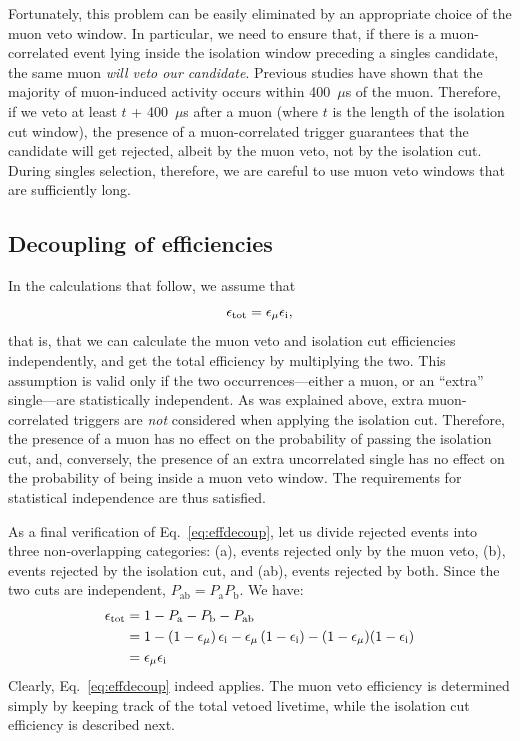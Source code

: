 \documentclass[../thesis.tex]{subfiles}
\begin{document}
Fortunately, this problem can be easily eliminated by an appropriate choice of the muon veto window. In particular, we need to ensure that, if there is a muon-correlated event lying inside the isolation window preceding a singles candidate, the same muon \emph{will veto our candidate}. Previous studies have shown that the majority of muon-induced activity occurs within 400~$\mu$s of the muon. Therefore, if we veto at least $t$ + 400~$\mu$s after a muon (where $t$ is the length of the isolation cut window), the presence of a muon-correlated trigger guarantees that the candidate will get rejected, albeit by the muon veto, not by the isolation cut. During singles selection, therefore, we are careful to use muon veto windows that are sufficiently long.

\subsection{Decoupling of efficiencies}
\label{sec:effdecoup}

\def\Pa{\ensuremath{P_\mathrm{a}}}
\def\Pb{\ensuremath{P_\mathrm{b}}}
\def\Pab{\ensuremath{P_\mathrm{ab}}}

In the calculations that follow, we assume that
\begin{equation}
  \label{eq:effdecoup}
  \epsilon_\mathrm{tot} = \epsilon_\mathrm{\mu} \epsilon_\mathrm{i},
\end{equation}
that is, that we can calculate the muon veto and isolation cut efficiencies independently, and get the total efficiency by multiplying the two. This assumption is valid only if the two occurrences---either a muon, or an ``extra'' single---are statistically independent. As was explained above, extra muon-correlated triggers are \emph{not} considered when applying the isolation cut. Therefore, the presence of a muon has no effect on the probability of passing the isolation cut, and, conversely, the presence of an extra uncorrelated single has no effect on the probability of being inside a muon veto window. The requirements for statistical independence are thus satisfied.

As a final verification of Eq.~\ref{eq:effdecoup}, let us divide rejected events into three non-overlapping categories: (a), events rejected only by the muon veto, (b), events rejected by the isolation cut, and (ab), events rejected by both. Since the two cuts are independent, $\Pab = \Pa\Pb$. We have:
\begin{align*}
  \etot &= 1 - \Pa - \Pb - \Pab \\
        &= 1 - (1-\emu)\,\eisol - \emu\,(1-\eisol) - (1-\emu)(1-\eisol) \\
        &= \emu \eisol
\end{align*}
Clearly, Eq.~\ref{eq:effdecoup} indeed applies. The muon veto efficiency is determined simply by keeping track of the total vetoed livetime, while the isolation cut efficiency is described next.
\end{document}
